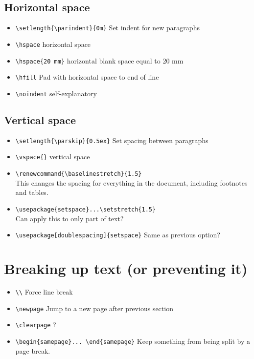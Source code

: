 \documentclass{article}
\begin{document}
\subsection{Horizontal space}
\begin{itemize}
    \item \verb|\setlength{\parindent}{0m}| Set indent for new paragraphs
    \item \verb|\hspace| horizontal space
    \item \verb|\hspace{20 mm}| horizontal blank space equal to 20 mm
    \item \verb|\hfill| Pad with horizontal space to end of line
    \item \verb|\noindent| self-explanatory
\end{itemize}

\subsection{Vertical space}
\begin{itemize}
    \item \verb|\setlength{\parskip}{0.5ex}| Set spacing between paragraphs
    \item \verb|\vspace{}| vertical space
    \item \verb|\renewcommand{\baselinestretch}{1.5}|\\
        This changes the spacing for everything in the document,
        including footnotes and tables.
    \item \verb|\usepackage{setspace}...\setstretch{1.5}|\\
        Can apply this to only part of text?
    \item \verb|\usepackage[doublespacing]{setspace}|
        Same as previous option?
\end{itemize}

\section{Breaking up text (or preventing it)}
\begin{itemize}
    \item \verb|\\| Force line break
    \item \verb|\newpage| Jump to a new page after previous section
    \item \verb|\clearpage|  ?
    \item \verb|\begin{samepage}... \end{samepage}| Keep something from
        being split by a page break.
\end{itemize}
\end{document}
